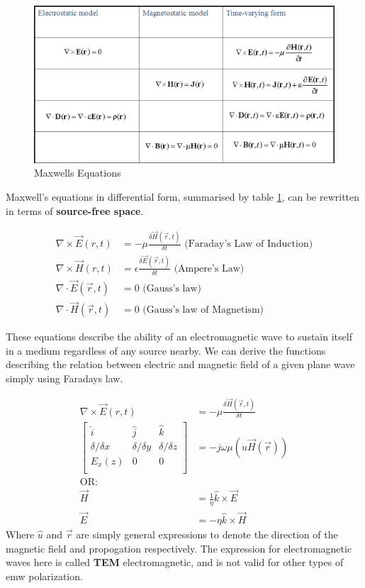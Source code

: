 \documentclass{book}
\begin{document}
\begin{figure}[h]
	\centering
	\includegraphics[width=0.7\linewidth]{Screenshots/maxwells_equations}
	\caption{Maxwells Equations}
	\label{fig:maxwellsequations}
\end{figure}

Maxwell's equations in differential form, summarised by table \ref{fig:maxwellsequations}, can be rewritten in terms of \textbf{source-free space}.

\begin{align*}
	\nabla \times \vec{E}(r,t) &= -\mu \frac{\delta \vec{H}(\vec{r},t)}{\delta t} \text{ (Faraday's Law of Induction)}\\
	\nabla \times \vec{H}(r,t) &= \epsilon \frac{\delta \vec{E} (\vec{r}, t)}{\delta t} \text{ (Ampere's Law)}\\
	\nabla \cdot \vec{E}(\vec{r}, t) &= 0 \text{ (Gauss's law)} \\
	\nabla \cdot \vec{H}(\vec{r}, t) &= 0 \text{ (Gauss's law of Magnetism)}
\end{align*}

These equations describe the ability of an electromagnetic wave to sustain itself in a medium regardless of any source nearby. We can derive the functions describing the relation between electric and magnetic field of a given plane wave simply using Faradays law.

\begin{align*}
	\nabla \times \vec{E}(r,t) &= -\mu \frac{\delta \vec{H}(\vec{r},t)}{\delta t} \\
	\begin{bmatrix}
		\hat{i} & \hat{j} & \hat{k} \\
		\delta/\delta x & \delta/\delta{y} & \delta/\delta{z}\\
		E_x(z) &0 & 0 \\
	\end{bmatrix}&= -j\omega \mu (\hat{u}\vec{H}(\vec{r})) \\
	\text{OR:  }&\\
	\vec{H} &= \frac{1}{\eta} \hat{k} \times \vec{E} \\
	\vec{E} &= -\eta \hat{k} \times \vec{H}
\end{align*}
Where $\hat{u}$ and $\vec{r}$ are simply general expressions to denote the direction of the magnetic field and propogation respectively. The expression for electromagnetic waves here is called \textbf{TEM} electromagnetic, and is not valid for other types of emw polarization. 
\end{document}
